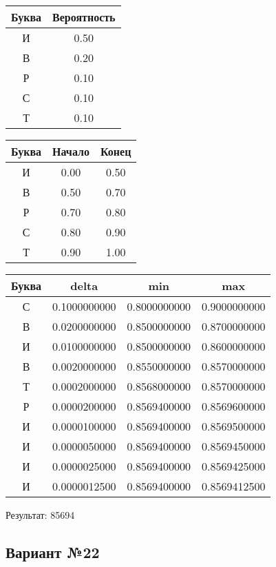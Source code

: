 \documentclass[a4paper, 12pt]{article}
\begin{document}
\begin{center}
 \begin{tabular}{ |c|c| } 
  \hline
     Буква & Вероятность \\ \hline
И & 0.50\\\hline
В & 0.20\\\hline
Р & 0.10\\\hline
С & 0.10\\\hline
Т & 0.10
\\ \hline \end{tabular}
\end{center}
\begin{center}
 \begin{tabular}{ |c|c|c| } 
  \hline
     Буква & Начало & Конец \\ \hline
И & 0.00 & 0.50\\\hline
В & 0.50 & 0.70\\\hline
Р & 0.70 & 0.80\\\hline
С & 0.80 & 0.90\\\hline
Т & 0.90 & 1.00
\\ \hline \end{tabular}
\end{center}
\begin{center}
 \begin{tabular}{ |c|c|c|c| } 
  \hline
     Буква & delta & min & max \\ \hline
С & 0.1000000000 & 0.8000000000 & 0.9000000000\\\hline
В & 0.0200000000 & 0.8500000000 & 0.8700000000\\\hline
И & 0.0100000000 & 0.8500000000 & 0.8600000000\\\hline
В & 0.0020000000 & 0.8550000000 & 0.8570000000\\\hline
Т & 0.0002000000 & 0.8568000000 & 0.8570000000\\\hline
Р & 0.0000200000 & 0.8569400000 & 0.8569600000\\\hline
И & 0.0000100000 & 0.8569400000 & 0.8569500000\\\hline
И & 0.0000050000 & 0.8569400000 & 0.8569450000\\\hline
И & 0.0000025000 & 0.8569400000 & 0.8569425000\\\hline
И & 0.0000012500 & 0.8569400000 & 0.8569412500
\\ \hline \end{tabular}
\end{center}
Результат: 85694
\pagebreak
\subsection{Вариант №22}
\end{document}
